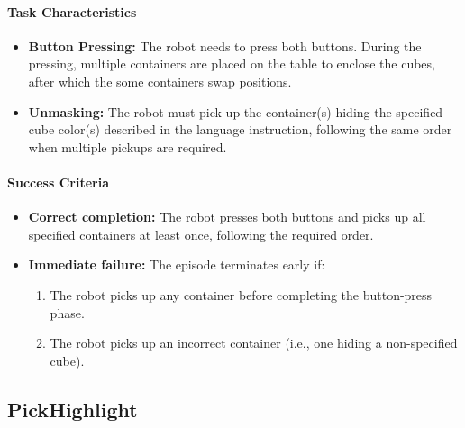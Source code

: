 \paragraph{Task Characteristics}
\begin{itemize}[itemsep=1pt, topsep=0pt, leftmargin=*]
    \item \textbf{Button Pressing:} The robot needs to press both buttons. During the pressing, multiple containers are placed on the table to enclose the cubes, after which the some containers swap positions. 
    
    \item \textbf{Unmasking:} The robot must pick up the container(s) hiding the specified cube color(s) described in the language instruction, following the same order when multiple pickups are required.
\end{itemize}
\paragraph{Success Criteria}
\begin{itemize}[itemsep=1pt, topsep=0pt, leftmargin=*]
    \item \textbf{Correct completion:} The robot presses both buttons and picks up all specified containers at least once, following the required order.
    
    \item \textbf{Immediate failure:} The episode terminates early if:
    \begin{enumerate}[itemsep=1pt, topsep=0pt, leftmargin=*]
        \item The robot picks up any container before completing the button-press phase.
        \item The robot picks up an incorrect container (i.e., one hiding a non-specified cube).
    \end{enumerate}
\end{itemize}

\clearpage




\subsection{PickHighlight}
\label{sec:task_pickhighlight}

